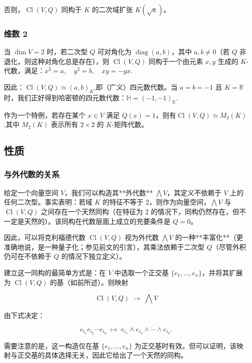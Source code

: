 否则，$\operatorname{Cl}(V, Q)$ 同构于 $K$ 的二次域扩张 $K(\sqrt{a})$。
\subsubsection{维数 2}
当 $\dim V = 2$ 时，若二次型 $Q$ 可对角化为 $\operatorname{diag}(a, b)$，其中 $a, b \neq 0$（若 $Q$ 非退化，则这种对角化总是存在），则 $\operatorname{Cl}(V, Q)$ 同构于一个由元素 $x, y$ 生成的 $K$-代数，满足：$x^2 = a, \quad y^2 = b, \quad xy = - yx$.

因此：$\operatorname{Cl}(V, Q) \simeq (a, b)_K$,即（广义）四元数代数。当 $a = b = -1$ 且 $K = \mathbb{R}$ 时，我们正好得到哈密顿的四元数代数：$\mathbb{H} = (-1, -1)_{\mathbb{R}}$.

作为一个特例，若存在某个 $x \in V$ 满足 $Q(x) = 1$，则有$\operatorname{Cl}(V, Q) \simeq M_2(K)$,其中 $M_2(K)$ 表示所有 $2 \times 2$ 的 $K$-矩阵代数。
\subsection{性质}
\subsubsection{与外代数的关系}
给定一个向量空间 $V$，我们可以构造其**外代数** $\bigwedge V$，其定义不依赖于 $V$ 上的任何二次型。事实表明：若域 $K$ 的特征不等于 2，则作为向量空间，$\bigwedge V$ 与 $\operatorname{Cl}(V, Q)$ 之间存在一个天然同构（在特征为 2 的情况下，同构仍然存在，但不一定是天然的）。该同构在代数层面上成立的充要条件是 $Q = 0$。

因此，可以将克利福德代数 $\operatorname{Cl}(V, Q)$ 视为外代数 $\bigwedge V$ 的一种**丰富化**（更准确地说，是一种量子化；参见前文的引言），其乘法依赖于二次型 $Q$（尽管外积仍可在不依赖于 $Q$ 的情况下独立定义）。

建立这一同构的最简单方式是：在 $V$ 中选取一个正交基 $\{e_1, \ldots, e_n\}$，并将其扩展为 $\operatorname{Cl}(V, Q)$ 的基（如前所述）。则映射

$$
\operatorname{Cl}(V, Q) \;\longrightarrow\; \bigwedge V
$$

由下式决定：

$$
e_{i_1} e_{i_2} \cdots e_{i_k} \;\mapsto\; e_{i_1} \wedge e_{i_2} \wedge \cdots \wedge e_{i_k}.
$$

需要注意的是，这一构造仅在基 $\{e_1, \ldots, e_n\}$ 为正交基时有效。但可以证明，该映射与正交基的具体选择无关，因此它给出了一个天然的同构。
